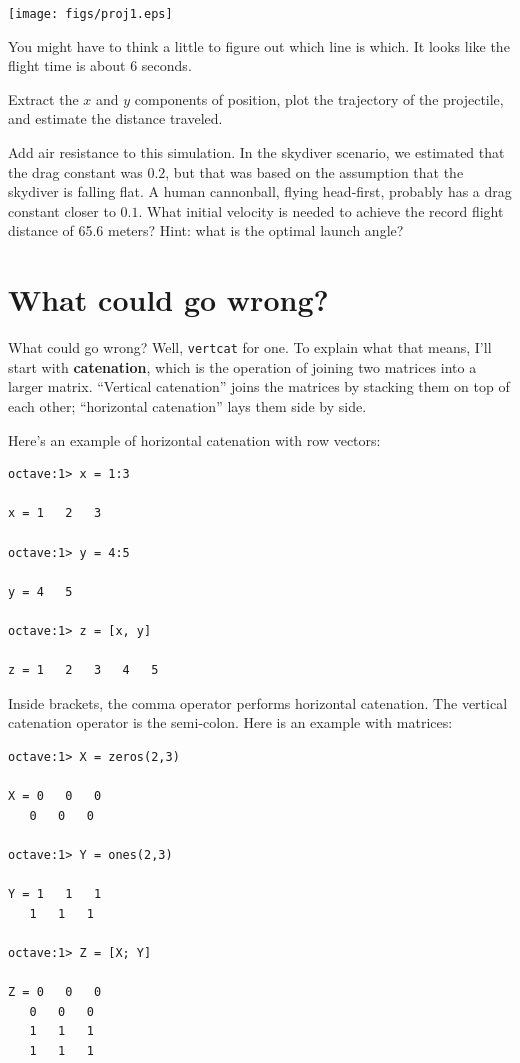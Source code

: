 \documentclass{book}
\begin{document}
\beforefig \centerline{\texttt{[image: figs/proj1.eps]}}

You might have to think a little to figure out which line is
which. It looks like the flight time is about 6 seconds.

\begin{ex}
Extract the $x$ and $y$ components of
position, plot the trajectory of the projectile, and estimate the
distance traveled.
\end{ex}

\begin{ex}
Add air resistance to this simulation. In
the skydiver scenario, we estimated that the drag constant was
$0.2$, but that was based on the assumption that the skydiver is
falling flat. A human cannonball, flying head-first, probably
has a drag constant closer to $0.1$. What initial velocity
is needed to achieve the record flight distance of 65.6 meters?
Hint: what is the optimal launch angle?
\end{ex}


\section{What could go wrong?}

What could go wrong? Well, {\tt vertcat} for one. To explain
what that means, I'll start with {\bf catenation}, which is
the operation of joining two matrices into a larger matrix.
``Vertical catenation'' joins the matrices by stacking them on
top of each other; ``horizontal catenation'' lays them
side by side.

Here's an example of horizontal catenation with row vectors:

\begin{verbatim}
octave:1> x = 1:3

x = 1   2   3

octave:1> y = 4:5

y = 4   5

octave:1> z = [x, y]

z = 1   2   3   4   5
\end{verbatim}

Inside brackets, the comma operator performs horizontal catenation.
The vertical catenation operator is the semi-colon. Here is an
example with matrices:

\begin{verbatim}
octave:1> X = zeros(2,3)

X = 0   0   0
   0   0   0

octave:1> Y = ones(2,3)

Y = 1   1   1
   1   1   1

octave:1> Z = [X; Y]

Z = 0   0   0
   0   0   0
   1   1   1
   1   1   1
\end{verbatim}
\end{document}
